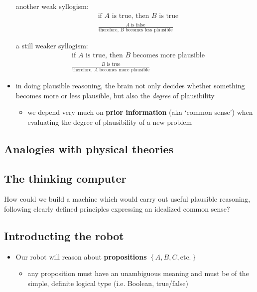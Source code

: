 \documentclass[9pt, letterpaper]{article}
\begin{document}
\begin{itemize}
    \begin{item}
        another weak syllogism:
        \begin{align*}
             &\text{if } A \text{ is true, then } B \text{ is true} \\
             &\frac{A \text{ is false}}{\text{therefore, } B \text{ becomes less plausible}}
        \end{align*}
    \end{item}
    \begin{item}
        a still weaker syllogism:
        \begin{align*}
             &\text{if } A \text{ is true, then } B \text{ becomes more plausible} \\
             &\frac{B \text{ is true}}{\text{therefore, } A \text{ becomes more plausible}}
        \end{align*}
    \end{item}
    \item{in doing plausible reasoning, the brain not only decides whether something becomes more or less plausible, but also the \textit{degree} of plausibility}
        \begin{itemize}
            \item{we depend very much on \textbf{prior information} (aka `common sense') when evaluating the degree of plausibility of a new problem}
        \end{itemize}
\end{itemize}

\subsection{Analogies with physical theories}

\subsection{The thinking computer}

How could we build a machine which would carry out useful plausible reasoning, following clearly defined principles expressing an idealized common sense?

\subsection{Introducting the robot}

\begin{itemize}
    \item{Our robot will reason about \textbf{propositions} $\left\{A, B, C, \text{etc.}\right\}$}
        \begin{itemize}
            \item{any proposition must have an unambiguous meaning and must be of the simple, definite logical type (i.e. Boolean, true/false)}
        \end{itemize}
\end{itemize}
\end{document}
